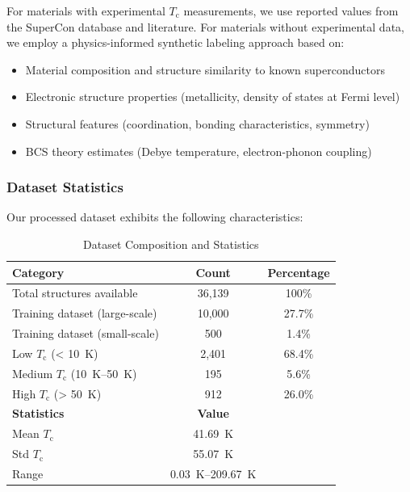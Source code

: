 \documentclass[11pt,a4paper]{article}
\begin{document}
For materials with experimental $T_{\text{c}}$ measurements, we use reported values from the SuperCon database and literature. For materials without experimental data, we employ a physics-informed synthetic labeling approach based on:

\begin{itemize}
    \item Material composition and structure similarity to known superconductors
    \item Electronic structure properties (metallicity, density of states at Fermi level)
    \item Structural features (coordination, bonding characteristics, symmetry)
    \item BCS theory estimates (Debye temperature, electron-phonon coupling)
\end{itemize}

\subsubsection{Dataset Statistics}

Our processed dataset exhibits the following characteristics:

\begin{table}[H]
\centering
\caption{Dataset Composition and Statistics}
\begin{tabular}{@{}lcc@{}}
\toprule
\textbf{Category} & \textbf{Count} & \textbf{Percentage} \\
\midrule
Total structures available & 36,139 & 100\% \\
Training dataset (large-scale) & 10,000 & 27.7\% \\
Training dataset (small-scale) & 500 & 1.4\% \\
Low $T_{\text{c}}$ (< \SI{10}{\kelvin}) & 2,401 & 68.4\% \\
Medium $T_{\text{c}}$ (\SI{10}{\kelvin}--\SI{50}{\kelvin}) & 195 & 5.6\% \\
High $T_{\text{c}}$ (> \SI{50}{\kelvin}) & 912 & 26.0\% \\
\midrule
\textbf{Statistics} & \textbf{Value} & \\
Mean $T_{\text{c}}$ & \SI{41.69}{\kelvin} & \\
Std $T_{\text{c}}$ & \SI{55.07}{\kelvin} & \\
Range & \SI{0.03}{\kelvin}--\SI{209.67}{\kelvin} & \\
\bottomrule
\end{tabular}
\end{table}
\end{document}
